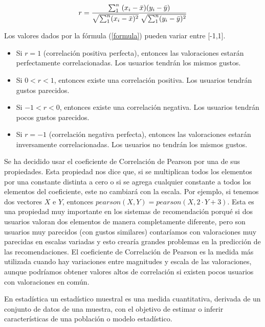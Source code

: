 \documentclass{uimppracticas}
\begin{document}
\begin{equation}\label{formula}
	\large r = \frac{\sum_{1}^{n} \; (x_{i} - \bar{x}) (y_{i} - \bar{y})}{\sqrt{\sum_{1}^{n}(x_{i} - \bar{x})^2} \; \sqrt{\sum_{1}^{n}(y_{i} - \bar{y})^2}}
\end{equation}

Los valores dados por la fórmula (\ref{formula}) pueden variar entre [-1,1].

\begin{itemize}
	\item Si $r=1$ (correlación positiva perfecta), entonces las valoraciones estarán perfectamente correlacionadas. Los usuarios tendrán los mismos gustos.
	\item Si $0<r<1$, entonces existe una correlación positiva. Los usuarios tendrán gustos parecidos.
	\item Si $-1<r<0$, entonces existe una correlación negativa. Los usuarios tendrán pocos gustos parecidos.
	\item Si $r=-1$ (correlación negativa perfecta), entonces las valoraciones estarán inversamente correlacionadas. Los usuarios no tendrán los mismos gustos.
\end{itemize}

Se ha decidido usar el coeficiente de Correlación de Pearson por una de sus propiedades. Esta propiedad nos dice que, si se multiplican todos los elementos por una constante distinta a cero o si se agrega cualquier constante a todos los elementos del coeficiente, este no cambiará con la escala. Por ejemplo, si tenemos dos vectores $X$ e $Y$, entonces $pearson(X,Y) = pearson(X,2\cdot Y+3)$. Esta es una propiedad muy importante en los sistemas de recomendación porqué si dos usuarios valoran dos elementos de manera completamente diferente, pero son usuarios muy parecidos (con gustos similares) contaríamos con valoraciones muy parecidas en escalas variadas y esto crearía grandes problemas en la predicción de las recomendaciones. El coeficiente de Correlación de Pearson es la medida más utilizada cuando hay variaciones entre magnitudes y escala de las valoraciones, aunque podríamos obtener valores altos de correlación si existen pocos usuarios con valoraciones en común.

\begin{definition}\label{estadístico_muestral}
En estadística un estadístico muestral es una medida cuantitativa, derivada de un conjunto de datos de una muestra, con el objetivo de estimar o inferir características de una población o modelo estadístico.
\end{definition}
\end{document}
